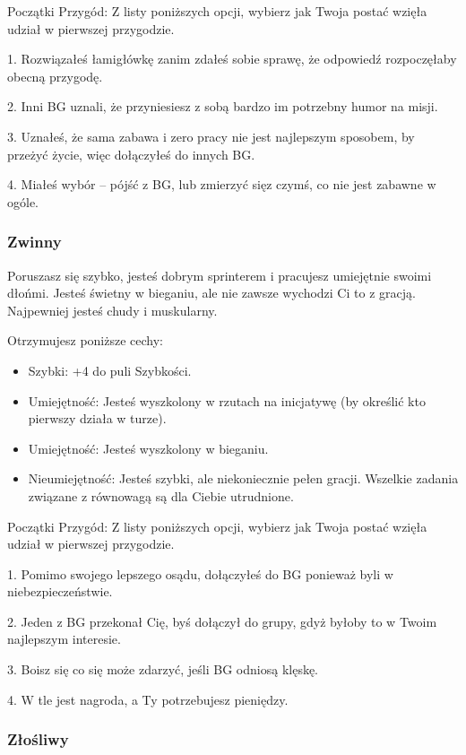 Początki Przygód: Z listy poniższych opcji, wybierz jak Twoja postać wzięła udział w pierwszej przygodzie.

1. Rozwiązałeś łamigłówkę zanim zdałeś sobie sprawę, że odpowiedź rozpoczęłaby obecną przygodę.

2. Inni BG uznali, że przyniesiesz z sobą bardzo im potrzebny humor na misji.

3. Uznałeś, że sama zabawa i zero pracy nie jest najlepszym sposobem, by przeżyć życie, więc dołączyłeś do innych BG.

4. Miałeś wybór – pójść z BG, lub zmierzyć sięz czymś, co nie jest zabawne w ogóle. 

\subsubsection{Zwinny}

Poruszasz się szybko, jesteś dobrym sprinterem i pracujesz umiejętnie swoimi dłońmi. Jesteś świetny w bieganiu, ale nie zawsze wychodzi Ci to z gracją. Najpewniej jesteś chudy i muskularny.

Otrzymujesz poniższe cechy:
\begin{itemize}
    \item Szybki: +4 do puli Szybkości.
    \item  Umiejętność: Jesteś wyszkolony w rzutach na inicjatywę (by określić kto pierwszy działa w turze).
    \item Umiejętność: Jesteś wyszkolony w bieganiu.
    \item  Nieumiejętność: Jesteś szybki, ale niekoniecznie pełen gracji. Wszelkie zadania związane z równowagą są dla Ciebie utrudnione. 
\end{itemize}

Początki Przygód: Z listy poniższych opcji, wybierz jak Twoja postać wzięła udział w pierwszej przygodzie.

1. Pomimo swojego lepszego osądu, dołączyłeś do BG ponieważ byli w niebezpieczeństwie. 

2. Jeden z BG przekonał Cię, byś dołączył do grupy, gdyż byłoby to w Twoim najlepszym interesie.

3. Boisz się co się może zdarzyć, jeśli BG odniosą klęskę.

4. W tle jest nagroda, a Ty potrzebujesz pieniędzy.

\subsubsection{Złośliwy}

